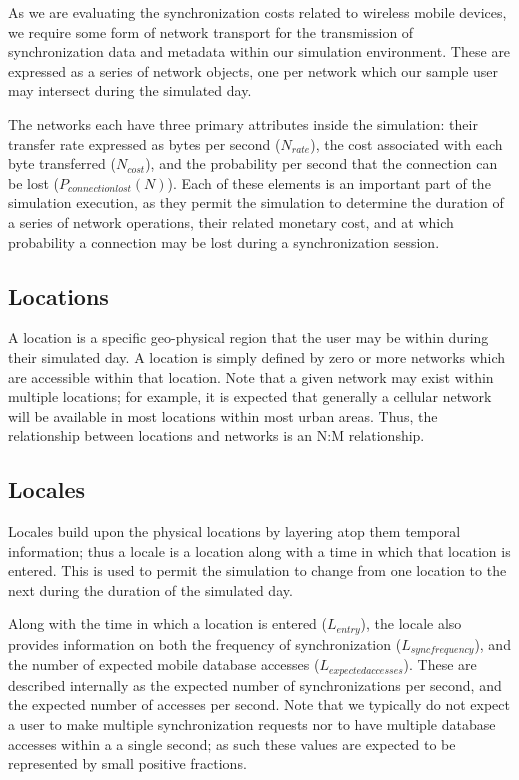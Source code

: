 As we are evaluating the synchronization costs related to wireless mobile devices, we require some form of network transport for the transmission of synchronization data and metadata within our simulation environment.  These are expressed as a series of network objects, one per network which our sample user may intersect during the simulated day.

The networks each have three primary attributes inside the simulation:  their transfer rate expressed as bytes per second ($N_{rate}$), the cost associated with each byte transferred ($N_{cost}$), and the probability per second that the connection can be lost ($P_{connection lost}(N)$).  Each of these elements is an important part of the simulation execution, as they permit the simulation to determine the duration of a series of network operations, their related monetary cost, and at which probability a connection may be lost during a synchronization session.

\subsection{Locations}

A location is a specific geo-physical region that the user may be within during their simulated day.  A location is simply defined by zero or more networks which are accessible within that location.  Note that a given network may exist within multiple locations; for example, it is expected that generally a cellular network will be available in most locations within most urban areas.  Thus, the relationship between locations and networks is an N:M relationship.

\subsection{Locales}\label{locales}

Locales build upon the physical locations by layering atop them temporal information; thus a locale is a location along with a time in which that location is entered.  This is used to permit the simulation to change from one location to the next during the duration of the simulated day.

Along with the time in which a location is entered ($L_{entry}$), the locale also provides information on both the frequency of synchronization ($L_{sync frequency}$), and the number of expected mobile database accesses ($L_{expected accesses}$).  These are described internally as the expected number of synchronizations per second, and the expected number of accesses per second.  Note that we typically do not expect a user to make multiple synchronization requests nor to have multiple database accesses within a a single second; as such these values are expected to be represented by small positive fractions.

